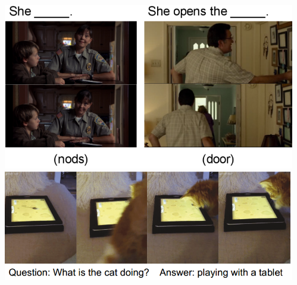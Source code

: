 \begin{frame}
\begin{columns}            
\begin{column}{0.6\textwidth}
\vspace{0.2in}
\begin{overlayarea}{\textwidth}{\textheight}
                \includegraphics[scale=0.25]{images/module8/fill-in-blank.png}\\
                \includegraphics[scale=0.3]{images/module8/open-end-video-QA.png}\\
\end{overlayarea}
\end{column}

\begin{column}{0.4\textwidth}
\begin{overlayarea}{\textwidth}{\textheight}


\end{overlayarea}
\end{column}
\end{columns}
\end{frame}
